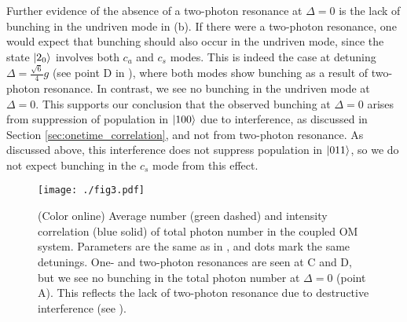 


Further evidence of the absence of a
two-photon resonance at $\Delta=0$ is
the lack of bunching in the undriven mode in  
(b).
If there were a two-photon resonance,
one would expect that bunching
should also occur in the undriven mode,
since the state $| 2_0 \rangle$ involves both $c_a$
and $c_s$ modes. 
This is indeed the case
at detuning $\Delta = \frac{\sqrt{6}}{4} g$
(see point D in ),
where
both modes show bunching as a result of
two-photon resonance.
In contrast, we see  no bunching in
the undriven mode at $\Delta = 0$. 
This supports our conclusion that the observed
bunching at $\Delta=0$ arises 
from suppression of 
population in $| 100 \rangle$ due to interference,
as discussed in Section \ref{sec:onetime_correlation},
and not from two-photon resonance.
As discussed above, this interference
does not suppress population in 
$| 011 \rangle$,
so we do not expect
bunching in the $c_s$ mode from this effect.
\begin{figure}[htb] 
\centering
  \texttt{[image: ./fig3.pdf]}
  \caption{
  \label{fig:populations}(Color online)
  Average number (green dashed) and intensity correlation
  (blue solid)
  of total photon number in the coupled OM system.
  Parameters are the same as in ,
  and dots mark the same detunings.
  One- and two-photon resonances are
  seen at C and D,
  but we see no bunching in the
  total photon number at 
  $\Delta = 0$ (point A).
  This reflects the lack
  of two-photon resonance due to 
  destructive interference (see ).  } 
\end{figure}

